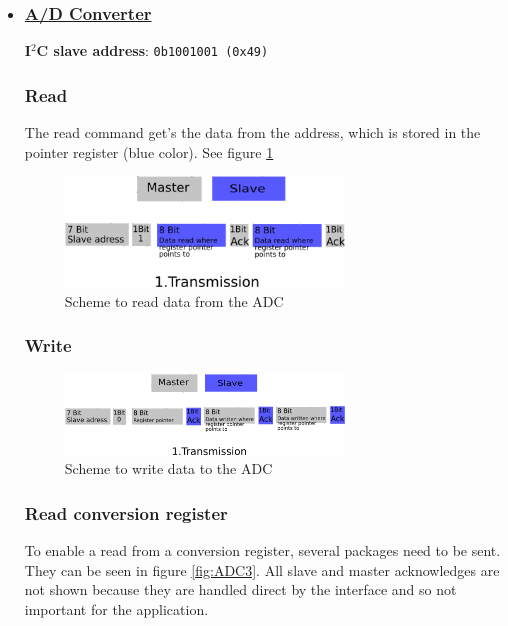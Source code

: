 \begin{itemize}
	\item \subsubsection{\underline{\textbf{A/D Converter}}}
\label{sec:hardware:Components:Adressing:ADC}

\textbf{I$^2$C slave address}: \texttt{0b1001001 (0x49)}

\subsubsection{Read}
\label{subsec:ADCread}

The read command get's the data from the address, which is stored in the pointer register (blue color). See figure \ref{fig:ADC1}

\begin{figure}[H]
	\centering\includegraphics[width=0.7\textwidth]{fig/I2C_Adressing/ADC_read}
	\caption{Scheme to read data from the ADC}
	\label{fig:ADC1}
\end{figure}

\subsubsection{Write}
\label{subsec:ADCwrite}


\begin{figure}[H]
	\centering\includegraphics[width=0.7\textwidth]{fig/I2C_Adressing/ADC_write}
	\caption{Scheme to write data to the ADC}
	\label{fig:ADC2}
\end{figure}

\subsubsection{Read conversion register}
\label{subsec:ADCconversion}
To enable a read from a conversion register, several packages need to be sent. They can be seen in figure \ref{fig:ADC3}. All slave and master acknowledges are not shown because they are handled direct by the interface and so not important for the application.


\end{itemize}
